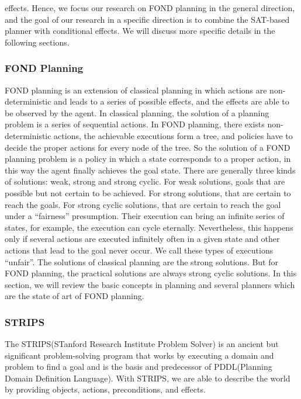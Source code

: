 \documentclass[a4paper,12pt]{article}
\begin{document}
effects. Hence, we focus our research on FOND planning in the general direction, and the goal of our research in a specific direction is to combine the SAT-based planner with conditional effects. We will discuss more specific details in the following sections.

\subsubsection{FOND Planning}
FOND planning is an extension of classical planning in which actions are non-deterministic and leads to a series of possible effects, and the effects are able to be observed by the agent\cite{key11}. In classical planning, the solution of a planning problem is a series of sequential actions. In FOND planning, there exists non-deterministic actions, the achievable executions form a tree, and policies have to decide the proper actions for every node of the tree. So the solution of a FOND planning problem is a policy in which a state corresponds to a proper action, in this way the agent finally achieves the goal state. There are generally three kinds of solutions: weak, strong and strong cyclic. For weak solutions, goals that are possible but not certain to be achieved. For strong solutions, that are certain to reach the goals. For strong cyclic solutions, that are certain to reach the goal under a “fairness” presumption\cite{key6}. Their execution can bring an infinite series of states, for example, the execution can cycle eternally. Nevertheless, this happens only if several actions are executed infinitely often in a given state and other actions that lead to the goal never occur. We call these types of executions “unfair”. The solutions of classical planning are the strong solutions. But for FOND planning, the practical solutions are always strong cyclic solutions\cite{key11}. In this section, we will review the basic concepts in planning and several planners which are the state of art of FOND planning.


\subsubsection{STRIPS}
The STRIPS(STanford Research Institute Problem Solver) is an ancient but significant problem-solving program that works by executing a domain and problem to find a goal and is the basis and predecessor of PDDL(Planning Domain Definition Language)\cite{key2}. With STRIPS, we are able to describe the world by providing objects, actions, preconditions, and effects.
\end{document}
